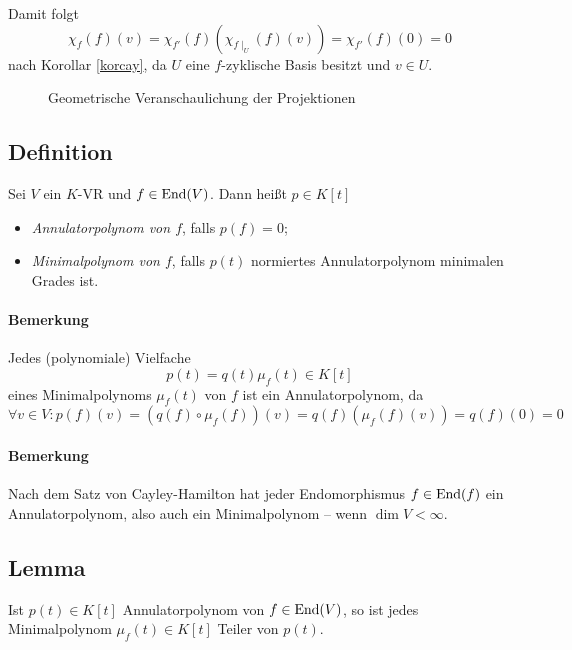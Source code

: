 	Damit folgt
		\[ \chi_f(f)(v) = \chi_{f'}(f) \left(\chi_{f\mid_U}(f)(v) \right) = \chi_{f'}(f)(0)=0 \]
	nach Korollar \ref{korcay}, da $ U $ eine $ f $-zyklische Basis besitzt und $ v\in U $.
	
	\begin{figure}[h]\centering
		
		\caption{Geometrische Veranschaulichung der Projektionen}
	\end{figure}\noindent
	
\subsection{Definition}
\begin{Definition}
	Sei $ V $ ein $ K $-VR und $ f\in\operatorname{End}(V) $. Dann heißt $ p\in K[t] $
		\begin{itemize}
			\item \emph{Annulatorpolynom von $ f $}, falls $ p(f)=0 $;
			\item \emph{Minimalpolynom von $ f $}, falls $ p(t) $ normiertes Annulatorpolynom minimalen Grades ist.
		\end{itemize}
\end{Definition}
\paragraph{Bemerkung}
	Jedes (polynomiale) Vielfache 
		\[ p(t) = q(t)\mu_f(t)\in K[t] \]
	eines Minimalpolynoms $ \mu_f(t) $ von $ f $ ist ein Annulatorpolynom, da
		\[ \forall v\in V: p(f)(v) = \left(q(f)\circ \mu_f(f)\right)(v) = q(f)\left(\mu_f(f)(v)\right) = q(f)(0) = 0 \]
\paragraph{Bemerkung}
	Nach dem Satz von Cayley-Hamilton hat jeder Endomorphismus $ f\in\operatorname{End}(f) $ ein Annulatorpolynom, also auch ein Minimalpolynom -- wenn $ \dim V < \infty $.
	
\subsection{Lemma}
\begin{Lemma} \label{minpol}
	Ist $ p(t)\in K[t] $ Annulatorpolynom von $ f\in\operatorname{End}(V) $, so ist jedes Minimalpolynom $ \mu_f(t)\in K[t] $ Teiler von $ p(t) $. 
\end{Lemma}

